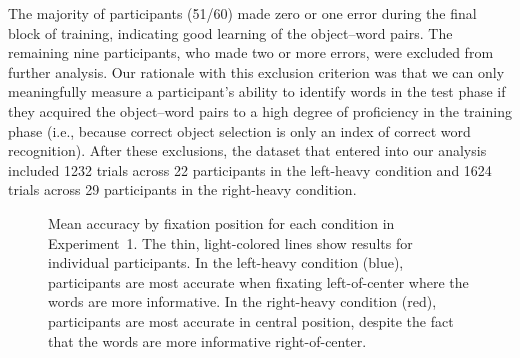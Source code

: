 \documentclass[doc,biblatex]{apa7}
\begin{document}
The majority of participants (51/60) made zero or one error during the final block of training, indicating good learning of the object--word pairs. The remaining nine participants, who made two or more errors, were excluded from further analysis. Our rationale with this exclusion criterion was that we can only meaningfully measure a participant's ability to identify words in the test phase if they acquired the object--word pairs to a high degree of proficiency in the training phase (i.e., because correct object selection is only an index of correct word recognition). After these exclusions, the dataset that entered into our analysis included 1232 trials across 22 participants in the left-heavy condition and 1624 trials across 29 participants in the right-heavy condition.

\begin{figure}
\vspace*{2pt}
\caption{Mean accuracy by fixation position for each condition in Experiment~1. The thin, light-colored lines show results for individual participants. In the left-heavy condition (blue), participants are most accurate when fixating left-of-center where the words are more informative. In the right-heavy condition (red), participants are most accurate in central position, despite the fact that the words are more informative right-of-center.}
\label{fig05}
\end{figure}
\end{document}
